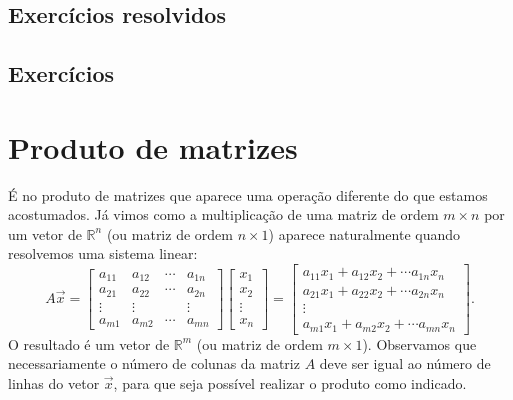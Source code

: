 \subsection*{Exercícios resolvidos}

\construirExeresol

\subsection*{Exercícios}

\construirExer


\section{Produto de matrizes}

É no produto de matrizes que aparece uma operação diferente do que estamos acostumados. Já vimos como a multiplicação de uma matriz de ordem $m\times n$ por um vetor de $\mathbb{R}^n$ (ou matriz de ordem $n\times 1$) aparece naturalmente quando resolvemos uma sistema linear:
\begin{equation}
A \vec{x} = \left[
\begin{array}{cccc}
a_{11} & a_{12} & \cdots & a_{1n} \\
a_{21} & a_{22} & \cdots & a_{2n} \\
\vdots & \vdots &        & \vdots \\
a_{m1} & a_{m2} & \cdots & a_{mn} 
\end{array}
\right]
\left[
\begin{array}{c}
x_{1} \\
x_{2} \\
\vdots \\
x_{n} 
\end{array}
\right] =
\left[
\begin{array}{c}
a_{11} x_{1} + a_{12} x_{2} + \cdots  a_{1n} x_{n} \\
a_{21} x_{1} + a_{22} x_{2} + \cdots  a_{2n} x_{n} \\
\vdots \\
a_{m1} x_{1} + a_{m2} x_{2} + \cdots  a_{mn} x_{n} 
\end{array}
\right].
\end{equation} O resultado é um vetor  de $\mathbb{R}^m$ (ou matriz de ordem $m\times 1$). Observamos que necessariamente o número de colunas da matriz $A$ deve ser igual ao número de linhas do vetor $\vec{x}$, para que seja possível realizar o produto como indicado.

